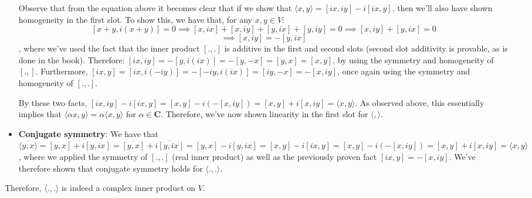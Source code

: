 \begin{solution}
\begin{itemize}
    Observe that from the equation above it becomes clear that if we show that $\langle x, y \rangle = [ix, iy] -i[ix, y]$, then we'll also have shown homogeneity in the first slot. To show this, we have that, for any $x, y \in V$:
    $$[x + y, i(x + y)] = 0 \implies [x, ix] + [x, iy] + [y, ix] + [y, iy] = 0 \implies [x, iy] + [y, ix] = 0 $$
    $$\implies [x, iy] = -[y, ix]$$
    , where we've used the fact that the inner product $[., .]$ is additive in the first and second slots (second slot additivity is provable, as is done in the book).
    Therefore: $[ix, iy] = -[y, i(ix)] = -[y, -x] = [y, x] = [x, y]$, by using the symmetry and homogeneity of $[., ]$. Furthermore, $[ix, y] = [ix, i(-iy)] = -[-iy, i(ix)] = [iy, -x] = -[x, iy]$, once again using the symmetry and homogeneity of $[., .]$.

    By these two facts, $[ix, iy] - i[ix, y] = [x, y] -i(-[x, iy]) = [x, y] + i[x, iy] = \langle x, y \rangle$. As observed above, this essentially implies that $\langle \alpha x, y \rangle = \alpha \langle x, y \rangle$ for $\alpha \in \mathbf{C}$. Therefore, we've now shown linearity in the first slot for $\langle, \rangle$.
    \item \textbf{Conjugate symmetry}: We have that $\overline{\langle y, x \rangle} = \overline{[y, x] + i[y, ix]} = \overline{[y, x]} + \overline{i[y, ix]} = [y, x] - i[y, ix] = [x, y] - i[ix, y] = [x, y] -i(-[x, iy]) = [x, y] + i[x, iy] = \langle x, y \rangle$, where we applied the symmetry of $[., .]$ (real inner product) as well as the previously proven fact $[ix, y] = -[x, iy]$. We've therefore shown that conjugate symmetry holds for $\langle ., . \rangle$.
\end{itemize}
Therefore, $\langle ., . \rangle$ is indeed a complex inner product on $V$.


\end{solution}
